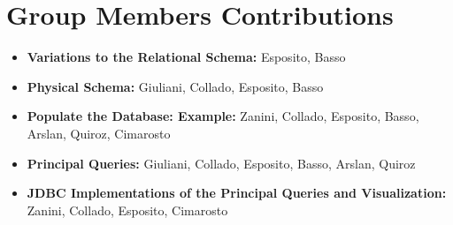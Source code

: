 \documentclass{article}
\begin{document}
\maketitle






\section{Group Members Contributions}
\begin{itemize}
	\item \textbf{Variations to the Relational Schema:} Esposito, Basso
	\item \textbf{Physical Schema:} Giuliani, Collado, Esposito, Basso
	\item \textbf{Populate the Database: Example:} Zanini, Collado, Esposito, Basso, Arslan, Quiroz, Cimarosto
	\item \textbf{Principal Queries:} Giuliani, Collado, Esposito, Basso, Arslan, Quiroz
	\item \textbf{JDBC Implementations of the Principal Queries and Visualization:} Zanini, Collado, Esposito, Cimarosto
\end{itemize}
\end{document}
